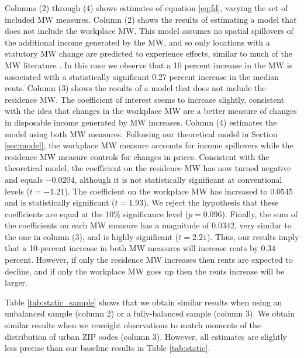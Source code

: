 Columns (2) through (4) shows estimates of equation \eqref{eq:fd}, varying the
set of included MW measures.
Column (2) shows the results of estimating a model that does not include the 
workplace MW. 
This model assumes no spatial spillovers of the additional income generated 
by the MW, and so only locations with a statutory MW change are predicted to 
experience effects, similar to much of the MW literature 
\parencite[e.g.,][]{DubeEtAl2010, MeerWest2016, Yamagishi2021}.
In this case we observe that a 10 percent increase in the MW is associated with
a statistically significant 0.27 percent increase in the median rents.
Column (3) shows the results of a model that does not include the residence MW.
The coefficient of interest seems to increase slightly, consistent with the idea 
that changes in the workplace MW are a better measure of changes in disposable 
income generated by MW increases.
Column (4) estimates the model using both MW measures.
Following our theoretical model in Section \ref{sec:model}, the workplace MW 
measure accounts for income spillovers while the residence MW measure controls
for changes in prices.
Consistent with the theoretical model, the coefficient on the residence 
MW has now turned negative and equals $-0.0204$, although it is not 
statistically significant at conventional levels ($t=-1.21$).
The coefficient on the workplace MW has increased to $0.0545$ and is 
statistically significant ($t=1.93$).
We reject the hypothesis that these coefficients are equal at the 10\% 
significance level ($p = 0.096$).
Finally, the sum of the coefficients on each MW measure has a magnitude of 
$0.0342$, very similar to the one in column (3), and is highly significant 
($t=2.21$).
Thus, our results imply that a 10-percent increase in both MW measures will 
increase rents by $0.34$ percent.
However, if only the residence MW increases then rents are expected to decline,
and if only the workplace MW goes up then the rents increase will be larger.

Table \ref{tab:static_sample} shows that we obtain similar results when
using an unbalanced sample (column 2) or a fully-balanced sample (column 3).
We obtain similar results when we reweight observations to match moments of 
the distribution of urban ZIP codes (column 3).
However, all estimates are slightly less precise than our baseline results in 
Table \ref{tab:static}.

